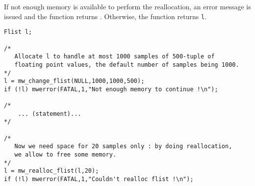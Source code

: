 If not enough memory is available to perform the reallocation, an error
message is issued and the function returns \Null.
Otherwise, the function returns \verb+l+.

\Next
\Example
\begin{verbatim}
Flist l;

/* 
   Allocate l to handle at most 1000 samples of 500-tuple of 
   floating point values, the default number of samples being 1000. 
*/
l = mw_change_flist(NULL,1000,1000,500);
if (!l) mwerror(FATAL,1,"Not enough memory to continue !\n");

/*
    ... (statement)...
*/

/*
   Now we need space for 20 samples only : by doing reallocation,
   we allow to free some memory.
*/
l = mw_realloc_flist(l,20);
if (!l) mwerror(FATAL,1,"Couldn't realloc flist !\n");


\end{verbatim}

\newpage %


